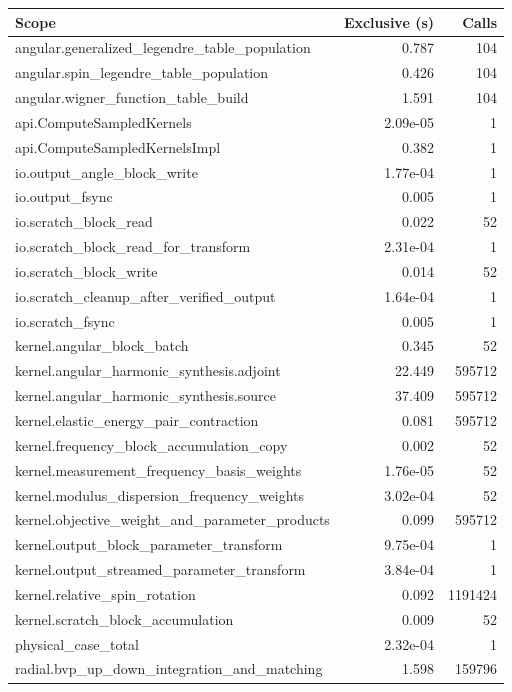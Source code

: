 \documentclass[11pt,a4paper]{article}
\begin{document}
\begingroup\scriptsize\begin{longtable}{>{\raggedright\arraybackslash}p{12cm}rr}\toprule Scope & Exclusive (s) & Calls\\\midrule\endhead
angular.generalized\_legendre\_table\_population & 0.787 & 104 \\
angular.spin\_legendre\_table\_population & 0.426 & 104 \\
angular.wigner\_function\_table\_build & 1.591 & 104 \\
api.ComputeSampledKernels & 2.09e-05 & 1 \\
api.ComputeSampledKernelsImpl & 0.382 & 1 \\
io.output\_angle\_block\_write & 1.77e-04 & 1 \\
io.output\_fsync & 0.005 & 1 \\
io.scratch\_block\_read & 0.022 & 52 \\
io.scratch\_block\_read\_for\_transform & 2.31e-04 & 1 \\
io.scratch\_block\_write & 0.014 & 52 \\
io.scratch\_cleanup\_after\_verified\_output & 1.64e-04 & 1 \\
io.scratch\_fsync & 0.005 & 1 \\
kernel.angular\_block\_batch & 0.345 & 52 \\
kernel.angular\_harmonic\_synthesis.adjoint & 22.449 & 595712 \\
kernel.angular\_harmonic\_synthesis.source & 37.409 & 595712 \\
kernel.elastic\_energy\_pair\_contraction & 0.081 & 595712 \\
kernel.frequency\_block\_accumulation\_copy & 0.002 & 52 \\
kernel.measurement\_frequency\_basis\_weights & 1.76e-05 & 52 \\
kernel.modulus\_dispersion\_frequency\_weights & 3.02e-04 & 52 \\
kernel.objective\_weight\_and\_parameter\_products & 0.099 & 595712 \\
kernel.output\_block\_parameter\_transform & 9.75e-04 & 1 \\
kernel.output\_streamed\_parameter\_transform & 3.84e-04 & 1 \\
kernel.relative\_spin\_rotation & 0.092 & 1191424 \\
kernel.scratch\_block\_accumulation & 0.009 & 52 \\
physical\_case\_total & 2.32e-04 & 1 \\
radial.bvp\_up\_down\_integration\_and\_matching & 1.598 & 159796 \\

\end{longtable}
\end{document}
